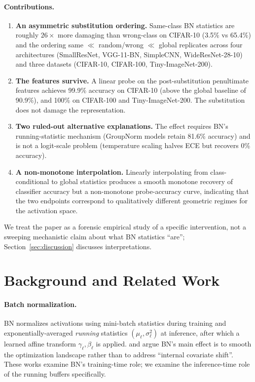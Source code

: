 \documentclass{article}
\begin{document}
\paragraph{Contributions.}
\begin{enumerate}
\setlength{\itemsep}{1pt}
\item \textbf{An asymmetric substitution ordering.} Same-class BN statistics are roughly $26\times$ more damaging than wrong-class on CIFAR-10 (3.5\% vs 65.4\%) and the ordering same $\ll$ random/wrong $\ll$ global replicates across four architectures (SmallResNet, VGG-11-BN, SimpleCNN, WideResNet-28-10) and three datasets (CIFAR-10, CIFAR-100, Tiny-ImageNet-200).
\item \textbf{The features survive.} A linear probe on the post-substitution penultimate features achieves 99.9\% accuracy on CIFAR-10 (above the global baseline of 90.9\%), and 100\% on CIFAR-100 and Tiny-ImageNet-200. The substitution does not damage the representation.
\item \textbf{Two ruled-out alternative explanations.} The effect requires BN's running-statistic mechanism (GroupNorm models retain 81.6\% accuracy) and is not a logit-scale problem (temperature scaling halves ECE but recovers 0\% accuracy).
\item \textbf{A non-monotone interpolation.} Linearly interpolating from class-conditional to global statistics produces a smooth monotone recovery of classifier accuracy but a non-monotone probe-accuracy curve, indicating that the two endpoints correspond to qualitatively different geometric regimes for the activation space.
\end{enumerate}

We treat the paper as a forensic empirical study of a specific intervention, not a sweeping mechanistic claim about what BN statistics ``are''; Section~\ref{sec:discussion} discusses interpretations.

\section{Background and Related Work}
\label{sec:bg}

\paragraph{Batch normalization.} BN \citep{ioffe2015batch} normalizes activations using mini-batch statistics during training and exponentially-averaged \emph{running} statistics $(\mu_\ell,\sigma_\ell^2)$ at inference, after which a learned affine transform $\gamma_\ell, \beta_\ell$ is applied. \citet{santurkar2018does} and \citet{bjorck2018understanding} argue BN's main effect is to smooth the optimization landscape rather than to address ``internal covariate shift''. These works examine BN's training-time role; we examine the inference-time role of the running buffers specifically.
\end{document}
